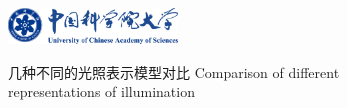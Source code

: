 \begin{figure}[!htbp]
    \centering
    \includegraphics[width=0.40\textwidth]{Img/ucas_logo.pdf}

    \bicaption
    {几种不同的光照表示模型对比}
    {Comparison of different representations of illumination}
    
    \label{fig:lighting-representation}
\end{figure}